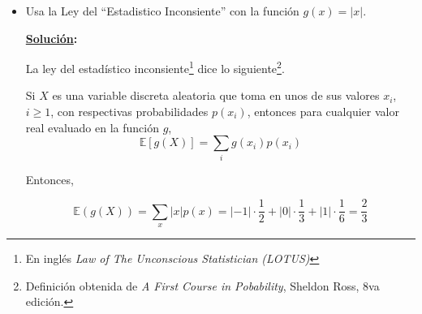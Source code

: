 \documentclass[11pt,letterpaper]{report}
\newcommand{\sol}{\textbf{\underline{Solución}: }} %
\begin{document}
\begin{enumerate}
\begin{itemize}
        \sol Recordando la definición de $\mathds{E}$:
        \begin{definition}
            Sea $X$ una variables aleatoria discreta con función de probabilidad $f(x)$. La esperanza
            de $X$ de define como el número
            $$  \mathds{E}(X) = \sum_{x} xf(x)  $$
            suponiendo que esta suma es absolutamente convergente, es decir, cuando la suma de los
            valores absolutos es convergente.
        \end{definition}
        
        Los valores que puede tomar la variable aleatoria $Y = |X|$ son 1 y 0. Entonces:
        Obteniendo $Y = 1$:
        \[
            P(Y=1) = P(X = -1 \lor X = 1) = P(X=-1) + P(X=1) = \frac{1}{2} + \frac{1}{6} = \frac{2}{3}
        \]
        Obteniendo $Y=0$:
        \[
            P(Y=0) = P(X=0) = \frac{1}{3}
        \]
        Finalmente obteniendo $\mathds{E}(|X|)$:
        \[
            \mathds{E}(|X|) = \mathds{E}(Y) = \sum_{x \in \{ 0, 1 \}} xf(x) =
            0 \cdot \frac{1}{3} + 1 \cdot \frac{2}{3} = \frac{2}{3}
        \]
        \item Usa la Ley del ``Estadistico Inconsiente'' con la función $g(x) = |x|$.
        
        \sol

        \begin{definition}
            La ley del estadístico inconsiente\footnote{En inglés \emph{Law of The Unconscious
            Statistician (LOTUS)}} dice lo siguiente\footnote{Definición obtenida de \emph{A First
            Course in Pobability}, Sheldon Ross, 8va edición.}.

            Si $X$ es una variable discreta aleatoria que toma en unos de sus valores $x_i$, $i \geq 1$,
            con respectivas probabilidades $p(x_i)$, entonces para cualquier valor real evaluado en
            la función $g$,
            $$  \mathds{E}[g(X)]= \sum_{i} g(x_i)p(x_i) $$
        \end{definition}

        Entonces,

        \[
            \mathds{E}(g(X)) = \sum_{x} |x| p(x) = |-1| \cdot \frac{1}{2} + |0| \cdot \frac{1}{3} +
            |1| \cdot \frac{1}{6} = \frac{2}{3}
        \]

    \end{itemize}


\end{enumerate}
\end{document}
